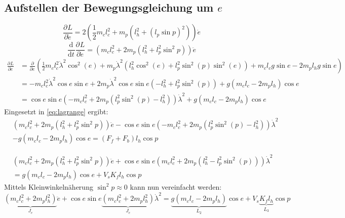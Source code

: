 \documentclass{article}
\newcommand{\partiell}[3][]{\frac{\partial^{#1}#2}{\partial{#3}^{#1}}}
\newcommand{\diff}[3][]{\frac{\mathrm{d}^{#1}#2}{\mathrm{d}{#3}^{#1}}}
\begin{document}
\subsection{Aufstellen der Bewegungsgleichung um $e$}
\begin{equation}
\partiell{L}{\dot{e}} = 2(\frac{1}{2}m_cl_c^2
+ m_p(l_h^2+(l_p\sin p)^2))\dot{e}
\end{equation}
\begin{equation}
\diff{}{t}\partiell{L}{\dot{e}} = (m_cl_c^2
+ 2 m_p(l_h^2+l_p^2\sin^2 p))\ddot{e}
\end{equation}
\begin{equation}
\begin{split}
\partiell{L}{e} &= \partiell{}{e}(\frac{1}{2} m_c l_c^2 \dot{\lambda}^2 \cos^2 (e) + m_p \dot{\lambda}^2 (l_h^2 \cos^2 (e) + l_p^2 \sin^2 (p) \sin^2 (e))
+ m_c l_c g \sin e - 2 m_p l_h g \sin e)\\
&= -m_c l_c^2 \dot{\lambda}^2 \cos e \sin e + 2 m_p \dot{\lambda}^2 \cos e \sin e (-l_h^2  + l_p^2 \sin^2 (p) ) + g(m_c l_c - 2 m_p l_h) \cos e\\
&= \cos e \sin e  (-m_c l_c^2 + 2 m_p (l_p^2 \sin^2 (p) -l_h^2  )) \dot{\lambda}^2+ g(m_c l_c - 2 m_p l_h) \cos e
\end{split}
\end{equation}
Eingesetzt in \eqref{eq:lagrange} ergibt:
\begin{equation}
\begin{split}
&(m_cl_c^2+ 2 m_p(l_h^2+l_p^2\sin^2 p))\ddot{e} - \cos e \sin e (-m_c l_c^2 + 2 m_p (l_p^2 \sin^2 (p) -l_h^2  ))\dot{\lambda}^2 \\
& - g(m_c l_c - 2 m_p l_h) \cos e = (F_f + F_b)l_h  \cos p
\end{split}
\end{equation}

\begin{equation}
\begin{split}
&(m_cl_c^2+ 2 m_p(l_h^2+l_p^2\sin^2 p))\ddot{e} + \cos e \sin e (m_c l_c^2 + 2 m_p ( l_h^2 -l_p^2 \sin^2 (p) )) \dot{\lambda}^2 \\
&= g(m_c l_c - 2 m_p l_h) \cos e + V_s K_f l_h  \cos p
\end{split}
\end{equation}
Mittels Kleinwinkelnäherung $\sin^2 p \approx 0$ kann nun vereinfacht werden:
\begin{equation}
\underbrace{(m_cl_c^2+ 2 m_p l_h^2)}_{J_e}\ddot{e} + \cos e \sin e \underbrace{(m_c l_c^2 + 2 m_p l_h^2 )}_{J_e} \dot{\lambda}^2 
= \underbrace{g(m_c l_c - 2 m_p l_h)}_{L_2} \cos e + V_s \underbrace{ K_f l_h}_{L_3}  \cos p
\end{equation}
\end{document}
